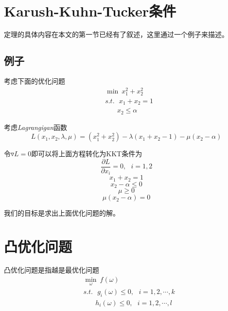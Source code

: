 \chapter{Karush-Kuhn-Tucker条件}

定理的具体内容在本文的第一节已经有了叙述，这里通过一个例子来描述。

\section{例子}

考虑下面的优化问题
\begin{equation}
    \begin{aligned}
        & \min\ x_1^2+x_2^2\\
        & s.t.\ \ \ x_1+x_2=1\\
        & \ \ \ \ \ \ \ \ x_2\leqslant \alpha
    \end{aligned}
\end{equation}

考虑\textsl{Lagrangigan}函数
\begin{equation}
    L(x_1,x_2,\lambda,\mu)=(x^2_1+x^2_2)-\lambda(x_1+x_2-1)-\mu(x_2-\alpha)
\end{equation}

令$\triangledown L=0$即可以将上面方程转化为KKT条件为
\begin{equation}
    \frac{\partial L}{\partial x_i}=0,\ \ \ i=1,2
\end{equation}
\begin{equation}
    x_1+x_2=1
\end{equation}
\begin{equation}
    x_2-\alpha\leqslant 0
\end{equation}
\begin{equation}
    \mu \geqslant 0
\end{equation}
\begin{equation}
    \mu(x_2-\alpha) = 0
\end{equation}

我们的目标是求出上面优化问题的解。

\chapter{凸优化问题}

凸优化问题是指越是最优化问题
\begin{equation}
    \begin{aligned}
        & \min\limits_{\omega}\ f(\omega)\\
        & s.t.\ \ \ g_i(\omega)\leqslant 0,\ \ \ i=1,2,\cdots,k\\
        & \ \ \ \ \ \ \ \ h_i(\omega)\leqslant 0,\ \ \ i=1,2,\cdots,l\\
    \end{aligned}
\end{equation}

